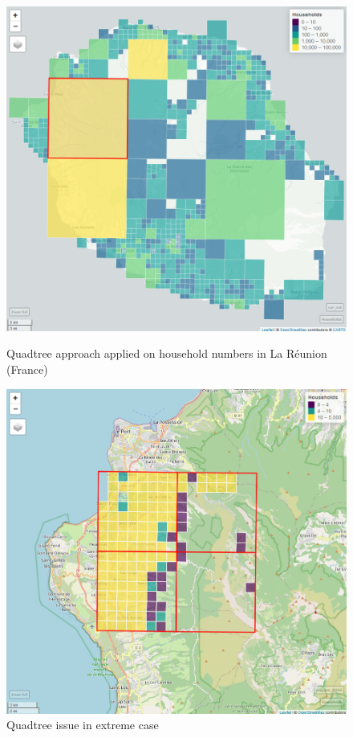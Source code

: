 \begin{figure}[H]
\begin{minipage}{0.48\linewidth}
    \centering
    \includegraphics[width=\linewidth]{figures/Quadtree/reunion_quadtree_filo2019.png}
    \caption{Quadtree approach applied on household numbers in La Réunion (France)}
    \label{fig:quadtree_reunion}
\end{minipage}
\hfill
\begin{minipage}{0.48\linewidth}
    \centering
    \includegraphics[width=\linewidth]{figures/Quadtree/reunion_quadtree_filo2019_issue.png}
    \caption{Quadtree issue in extreme case\\ \ }
    \label{fig:quadtree_reunion_issue}
\end{minipage}
\end{figure}

